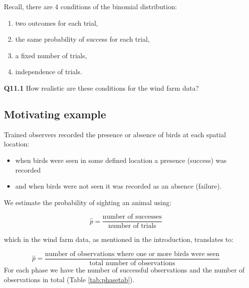 \documentclass[
  oneside]{krantz}
\providecommand{\tightlist}{%
  \setlength{\itemsep}{0pt}\setlength{\parskip}{0pt}}
\begin{document}
Recall, there are 4 conditions of the binomial distribution:

\begin{enumerate}
\def\labelenumi{\arabic{enumi}.}
\tightlist
\item
  two outcomes for each trial,
\item
  the same probability of success for each trial,
\item
  a fixed number of trials,
\item
  independence of trials.
\end{enumerate}

\textbf{Q11.1} How realistic are these conditions for the wind farm data?

\hypertarget{motivating-example}{%
\subsection{Motivating example}\label{motivating-example}}

Trained observers recorded the presence or absence of birds at each spatial location:

\begin{itemize}
\tightlist
\item
  when birds were seen in some defined location a presence (success) was recorded
\item
  and when birds were not seen it was recorded as an absence (failure).
\end{itemize}

We estimate the probability of sighting an animal using:

\[\hat{p}=\frac{\text{number of successes}}{\text{number of trials}} \]

which in the wind farm data, as mentioned in the introduction, translates to:

\[\hat p = \frac{\textrm{number of observations where one or more birds were seen}}{\textrm{total number of observations}}\]
For each phase we have the number of successful observations and the number of observations in total (Table \ref{tab:phasetab}).
\end{document}
